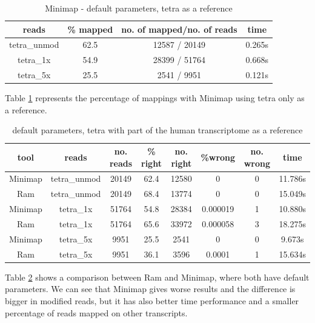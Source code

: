 \documentclass[times, utf8, zavrsni, numeric]{fer}
\begin{document}
\begin{table}[H]
    \caption{Minimap - default parameters, tetra as a reference}
    \label{minimapDefaultTetra}
    \centering
    {\begin{tabular}{cccc}
    \hline
    \textbf{reads} & \textbf{\% mapped} & \textbf{no. of mapped/no. of reads}  & \textbf{time}  \\ \hline
    tetra\_unmod & 62.5 & 12587 / 20149 & 0.265s \\ \hline
    tetra\_1x & 54.9 & 28399 / 51764 & 0.668s \\ \hline
    tetra\_5x & 25.5 & 2541 / 9951 & 0.121s \\ \hline
    \end{tabular}}
\end{table}
 
Table \ref{minimapDefaultTetra} represents the percentage of mappings with Minimap using tetra only as a reference. \\

\begin{longtable}{cccccccc}
    \caption{default parameters, tetra with part of the human transcriptome as a reference}
    \label{minimapRamComaprison} \\
    \hline \multicolumn{1}{c}{\textbf{tool}} & \multicolumn{1}{c}{\textbf{reads}} & 
    \multicolumn{1}{c}{\textbf{no. reads}} & \multicolumn{1}{c}{\textbf{\% right}} & 
    \multicolumn{1}{c}{\textbf{no. right}} & \multicolumn{1}{c}{\textbf{\%wrong}} & 
    \multicolumn{1}{c}{\textbf{no. wrong}} & \multicolumn{1}{c}{\textbf{time}}  \\ \hline
    \endfirsthead
    Minimap & tetra\_unmod & 20149 & 62.4 & 12580 & 0 & 0 & 11.786s \\ \hline
    Ram & tetra\_unmod & 20149 & 68.4 & 13774 & 0 & 0 & 15.049s \\ \hline
    Minimap & tetra\_1x & 51764 & 54.8 & 28384 & 0.000019 & 1 & 10.880s \\ \hline
    Ram & tetra\_1x & 51764 & 65.6 & 33972 & 0.000058 & 3 & 18.275s \\ \hline
    Minimap & tetra\_5x & 9951 & 25.5 & 2541 & 0 & 0 & 9.673s \\ \hline
    Ram & tetra\_5x & 9951 & 36.1 & 3596 & 0.0001 & 1 & 15.634s \\ \hline
\end{longtable}

Table \ref{minimapRamComaprison} shows a comparison between Ram and Minimap, where both have 
default parameters. We can see that Minimap gives worse results and the
difference is bigger in modified reads, but it has also better time
performance and a smaller percentage of reads mapped on other transcripts.
\end{document}
